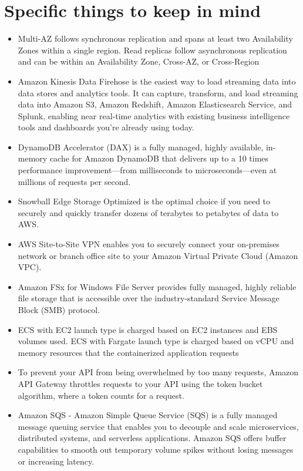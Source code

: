 \documentclass[]{scrartcl}
\begin{document}
\section{Specific things to keep in mind}
\begin{itemize}
	\item Multi-AZ follows synchronous replication and spans at least two Availability Zones within a single region. Read replicas follow asynchronous replication and can be within an Availability Zone, Cross-AZ, or Cross-Region
	\item Amazon Kinesis Data Firehose is the easiest way to load streaming data into data stores and analytics tools. It can capture, transform, and load streaming data into Amazon S3, Amazon Redshift, Amazon Elasticsearch Service, and Splunk, enabling near real-time analytics with existing business intelligence tools and dashboards you’re already using today. 
	\item DynamoDB Accelerator (DAX) is a fully managed, highly available, in-memory cache for Amazon DynamoDB that delivers up to a 10 times performance improvement—from milliseconds to microseconds—even at millions of requests per second.
	\item Snowball Edge Storage Optimized is the optimal choice if you need to securely and quickly transfer dozens of terabytes to petabytes of data to AWS. 
	\item AWS Site-to-Site VPN enables you to securely connect your on-premises network or branch office site to your Amazon Virtual Private Cloud (Amazon VPC). 
	\item Amazon FSx for Windows File Server provides fully managed, highly reliable file storage that is accessible over the industry-standard Service Message Block (SMB) protocol. 
	\item ECS with EC2 launch type is charged based on EC2 instances and EBS volumes used. ECS with Fargate launch type is charged based on vCPU and memory resources that the containerized application requests
	\item To prevent your API from being overwhelmed by too many requests, Amazon API Gateway throttles requests to your API using the token bucket algorithm, where a token counts for a request.
	\item Amazon SQS - Amazon Simple Queue Service (SQS) is a fully managed message queuing service that enables you to decouple and scale microservices, distributed systems, and serverless applications. Amazon SQS offers buffer capabilities to smooth out temporary volume spikes without losing messages or increasing latency.

\end{itemize}
\end{document}
